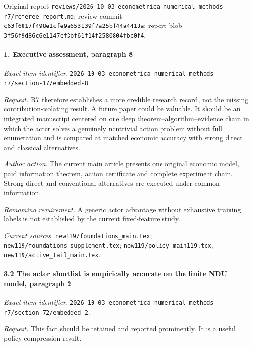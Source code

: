Original report \nolinkurl{reviews/2026-10-03-econometrica-numerical-methods-r7/referee_report.md}; review commit \nolinkurl{c63f6817f498e1cfe9a653139f7a25bf44a4418a}; report blob \nolinkurl{3f56f9d86c6e1147cf3bf61f14f2580804fbc0f4}.

\paragraph{1. Executive assessment, paragraph 8}

\emph{Exact item identifier.} \nolinkurl{2026-10-03-econometrica-numerical-methods-r7/section-17/embedded-8}.

\par\emph{Request.} R7 therefore establishes a more credible research record, not the missing contribution-isolating result. A future paper could be valuable. It should be an integrated manuscript centered on one deep theorem--algorithm--evidence chain in which the actor solves a genuinely nontrivial action problem without full enumeration and is compared at matched economic accuracy with strong direct and classical alternatives.

\par\emph{Author action.} The current main article presents one original economic model, paid information theorem, action certificate and complete experiment chain. Strong direct and conventional alternatives are executed under common information.

\par\emph{Remaining requirement.} A generic actor advantage without exhaustive training labels is not established by the current fixed-feature study.

\par\emph{Current sources.} \nolinkurl{new119/foundations_main.tex}; \nolinkurl{new119/foundations_supplement.tex}; \nolinkurl{new119/policy_main119.tex}; \nolinkurl{new119/active_tail_main.tex}.

\paragraph{3.2 The actor shortlist is empirically accurate on the finite NDU model, paragraph 2}

\emph{Exact item identifier.} \nolinkurl{2026-10-03-econometrica-numerical-methods-r7/section-72/embedded-2}.

\par\emph{Request.} This fact should be retained and reported prominently. It is a useful policy-compression result.


